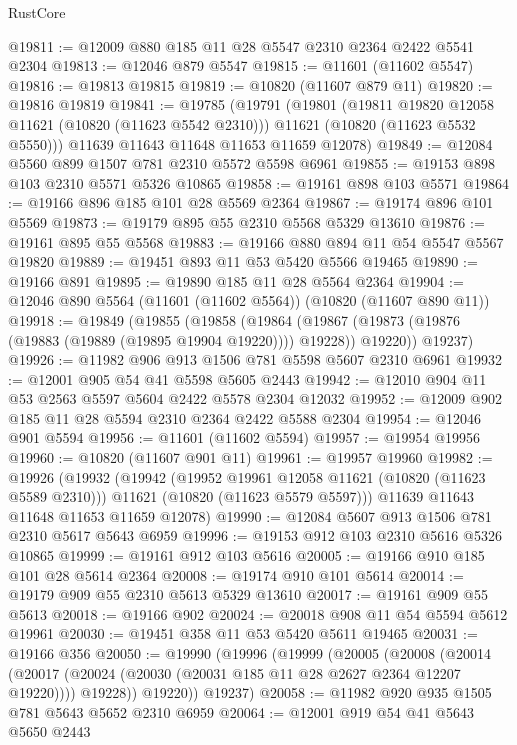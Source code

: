 \begin{lexlean}{RustCore}
\begin{coremodule}
@19811 := @12009 @880 @185 @11 @28 @5547 @2310 @2364 @2422 @5541 @2304
@19813 := @12046 @879 @5547
@19815 := @11601 (@11602 @5547)
@19816 := @19813 @19815
@19819 := @10820 (@11607 @879 @11)
@19820 := @19816 @19819
@19841 := @19785
    (@19791
      (@19801
        (@19811 @19820 @12058 @11621 (@10820 (@11623 @5542 @2310)))
        @11621
        (@10820 (@11623 @5532 @5550)))
      @11639
      @11643
      @11648
      @11653
      @11659
      @12078)
@19849 := @12084 @5560 @899 @1507 @781 @2310 @5572 @5598 @6961
@19855 := @19153 @898 @103 @2310 @5571 @5326 @10865
@19858 := @19161 @898 @103 @5571
@19864 := @19166 @896 @185 @101 @28 @5569 @2364
@19867 := @19174 @896 @101 @5569
@19873 := @19179 @895 @55 @2310 @5568 @5329 @13610
@19876 := @19161 @895 @55 @5568
@19883 := @19166 @880 @894 @11 @54 @5547 @5567 @19820
@19889 := @19451 @893 @11 @53 @5420 @5566 @19465
@19890 := @19166 @891
@19895 := @19890 @185 @11 @28 @5564 @2364
@19904 := @12046 @890 @5564 (@11601 (@11602 @5564)) (@10820 (@11607 @890 @11))
@19918 := @19849
    (@19855
      (@19858
        (@19864 (@19867 (@19873 (@19876 (@19883 (@19889 (@19895 @19904 @19220)))) @19228)) @19220))
      @19237)
@19926 := @11982 @906 @913 @1506 @781 @5598 @5607 @2310 @6961
@19932 := @12001 @905 @54 @41 @5598 @5605 @2443
@19942 := @12010 @904 @11 @53 @2563 @5597 @5604 @2422 @5578 @2304 @12032
@19952 := @12009 @902 @185 @11 @28 @5594 @2310 @2364 @2422 @5588 @2304
@19954 := @12046 @901 @5594
@19956 := @11601 (@11602 @5594)
@19957 := @19954 @19956
@19960 := @10820 (@11607 @901 @11)
@19961 := @19957 @19960
@19982 := @19926
    (@19932
      (@19942
        (@19952 @19961 @12058 @11621 (@10820 (@11623 @5589 @2310)))
        @11621
        (@10820 (@11623 @5579 @5597)))
      @11639
      @11643
      @11648
      @11653
      @11659
      @12078)
@19990 := @12084 @5607 @913 @1506 @781 @2310 @5617 @5643 @6959
@19996 := @19153 @912 @103 @2310 @5616 @5326 @10865
@19999 := @19161 @912 @103 @5616
@20005 := @19166 @910 @185 @101 @28 @5614 @2364
@20008 := @19174 @910 @101 @5614
@20014 := @19179 @909 @55 @2310 @5613 @5329 @13610
@20017 := @19161 @909 @55 @5613
@20018 := @19166 @902
@20024 := @20018 @908 @11 @54 @5594 @5612 @19961
@20030 := @19451 @358 @11 @53 @5420 @5611 @19465
@20031 := @19166 @356
@20050 := @19990
    (@19996
      (@19999
        (@20005
          (@20008
            (@20014
              (@20017 (@20024 (@20030 (@20031 @185 @11 @28 @2627 @2364 @12207 @19220))))
              @19228))
          @19220))
      @19237)
@20058 := @11982 @920 @935 @1505 @781 @5643 @5652 @2310 @6959
@20064 := @12001 @919 @54 @41 @5643 @5650 @2443

\end{coremodule}
\end{lexlean}
